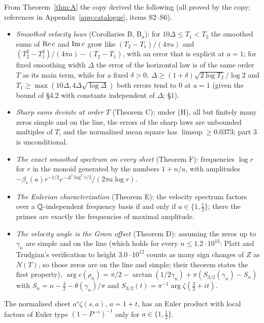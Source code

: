 From Theorem~\ref{thm:A} the copy derived the following (all proved by the copy; references in Appendix~\ref{app:catalogue}, items S2--S6).
\begin{itemize}
\item \emph{Smoothed velocity laws} (Corollaries B, B$_a$): for $10\Delta\le T_1<T_2$ the smoothed sums of $\operatorname{Re} c$ and $\operatorname{Im} c$ grow like $(T_2-T_1)/(4\pi a)$ and $(T_2^2-T_1^2)/(4\pi a)-(T_2-T_1)$, with an error that is explicit at $a=1$; for fixed smoothing width $\Delta$ the error of the horizontal law is of the same order $T$ as its main term, while for a fixed $\delta>0$, $\Delta\ge(1+\delta)\sqrt{2\log T_2}/\log2$ and $T_1\ge\max(10\Delta,4\Delta\sqrt{\log\Delta})$ both errors tend to $0$ at $a=1$ (given the bound of  §4.2 with constants independent of $\Delta$;  §1).
\item \emph{Sharp sums deviate at order $T$} (Theorem C): under (H), all but finitely many zeros simple and on the line, the errors of the sharp laws are unbounded multiples of $T$, and the normalized mean square has $\limsup\ge0.0373$; part 3 is unconditional.
\item \emph{The exact smoothed spectrum on every sheet} (Theorem F): frequencies $\log r$ for $r$ in the monoid generated by the numbers $1+n/a$, with amplitudes $-\beta_r(a)r^{-1/2}e^{-\Delta^2\log^2r/2}/(2\pi a\log r)$.
\item \emph{The Eulerian characterization} (Theorem E): the velocity spectrum factors over a $\mathbb{Q}$-independent frequency basis if and only if $a\in\{1,\tfrac12\}$; there the primes are exactly the frequencies of maximal amplitude.
\item \emph{The velocity angle is the Gram offset} (Theorem D): assuming the zeros up to $\gamma_n$ are simple and on the line (which holds for every $n\le1.2\cdot10^{13}$: Platt and Trudgian's verification to height $3.0\cdot10^{12}$ \cite{PlattTrudgian} counts as many sign changes of $Z$ as $N(T)$, so those zeros are on the line and simple; their theorem states the first property), $\arg c(\rho_n)=\pi/2-\arctan(1/2\gamma_n)+\pi(S_{3/2}(\gamma_n)-S_n)$ with $S_n=n-\tfrac32-\theta(\gamma_n)/\pi$ and $S_{3/2}(t)=\pi^{-1}\arg\zeta(\tfrac32+it)$.
\end{itemize}

\begin{corollary}\label{cor:eulerian}
The normalised sheet $a^s\zeta(s,a)$, $a=1+t$, has an Euler product with local factors of Euler type $(1-P^{-s})^{-1}$ only for $a\in\{1,\tfrac12\}$.
\end{corollary}

